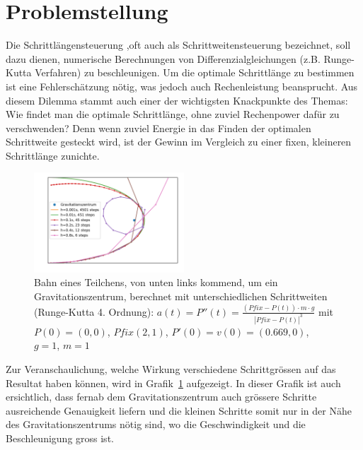 %
%
%
\section{Problemstellung
\label{steps:section:problemstellung}}
Die Schrittlängensteuerung ,oft auch als Schrittweitensteuerung bezeichnet,
soll dazu dienen, numerische Berechnungen von Differenzialgleichungen (z.B. Runge-Kutta Verfahren) zu beschleunigen.
Um die optimale Schrittlänge zu bestimmen ist eine Fehlerschätzung nötig,
was jedoch auch Rechenleistung beansprucht.
Aus diesem Dilemma stammt auch einer der wichtigsten Knackpunkte des Themas:
Wie findet man die optimale Schrittlänge, ohne zuviel Rechenpower dafür zu verschwenden?
Denn wenn zuviel Energie in das Finden der optimalen Schrittweite gesteckt wird,
ist der Gewinn im Vergleich zu einer fixen, kleineren Schrittlänge zunichte.

\begin{figure}
\centering
\includegraphics[width=0.5\textwidth]{papers/steps/img/gravity_different_fixed_stepsize.pdf}
\caption{Bahn eines Teilchens, von unten links kommend,
um ein Gravitationszentrum, berechnet mit unterschiedlichen Schrittweiten (Runge-Kutta 4. Ordnung):
$a(t)=P''(t)=\frac{(Pfix-P(t))\cdot m\cdot g}{|Pfix-P(t)|^{3}}$
mit $P(0)=(0, 0)$, $Pfix(2, 1)$, $P'(0)=v(0)=(0.669, 0)$, $g=1$, $m=1$
\label{buch:steps:fixed_comparison}}
\end{figure}

Zur Veranschaulichung, welche Wirkung verschiedene Schrittgrössen
auf das Resultat haben können, wird in Grafik~\ref{buch:steps:fixed_comparison} aufgezeigt.
In dieser Grafik ist auch ersichtlich, dass fernab dem Gravitationszentrum auch grössere Schritte
ausreichende Genauigkeit liefern und die kleinen Schritte somit nur in der Nähe des Gravitationszentrums
nötig sind, wo die Geschwindigkeit und die Beschleunigung gross ist.




